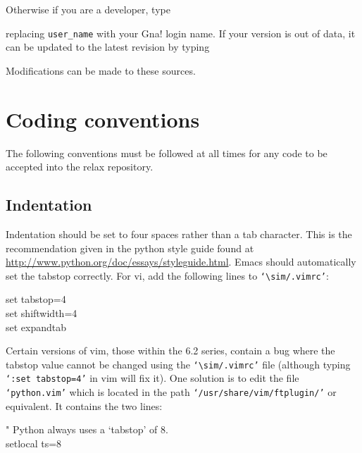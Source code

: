 
Otherwise if you are a developer, type


replacing \texttt{user\_name} with your Gna! login name.  If your version is out of data, it can be updated to the latest revision by typing


Modifications can be made to these sources.




\section{Coding conventions}

The following conventions must be followed at all times for any code to be accepted into the relax repository.



\subsection{Indentation}

Indentation should be set to four spaces rather than a tab character.  This is the recommendation given in the python style guide found at \href{http://www.python.org/doc/essays/styleguide.html}{http://www.python.org/doc/essays/styleguide.html}.  Emacs should automatically set the tabstop correctly.  For vi, add the following lines to \texttt{`$\sim$/.vimrc'}:

\begin{exampleenv}
set tabstop=4 \\
set shiftwidth=4 \\
set expandtab
\end{exampleenv}

Certain versions of vim, those within the 6.2 series, contain a bug where the tabstop value cannot be changed using the \texttt{`$\sim$/.vimrc'} file (although typing \texttt{`:set tabstop=4'} in vim will fix it).  One solution is to edit the file \texttt{`python.vim'} which is located in the path \texttt{`/usr/share/vim/ftplugin/'} or equivalent. It contains the two lines:

\begin{exampleenv}
" Python always uses a `tabstop' of 8. \\
setlocal ts=8
\end{exampleenv}

